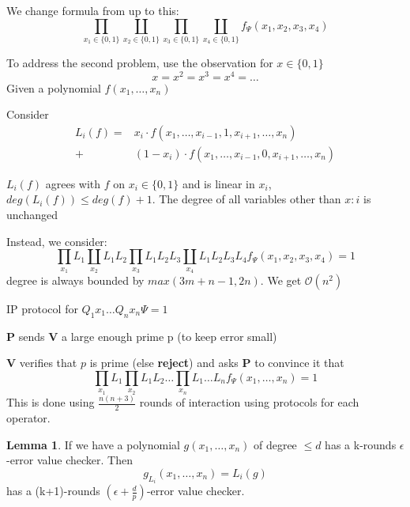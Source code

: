\documentclass[a4paper,12pt]{article}
\theoremstyle{definition}
\newtheorem{lemma}[counter]{Lemma}
\theoremstyle{remark}
\begin{document}
We change formula from up to this:
\begin{equation*}
    \prod_{x_1 \in \{0, 1\}} \coprod_{x_2 \in \{0, 1\}} \prod_{x_3 \in \{0, 1\}} \coprod_{x_4 \in \{0, 1\}} f_\Psi (x_1, x_2, x_3, x_4)
\end{equation*}

To address the second problem, use the observation for $x \in \{0, 1\}$
\begin{equation*}
    x = x^2 = x^3 = x^4 = \dots
\end{equation*}
Given a polynomial $f(x_1, \dots, x_n)$

Consider
\begin{align*}
    L_i(f) =& x_i \cdot f(x_1, \dots, x_{i-1}, 1, x_{i+1}, \dots, x_n) \\
           +& (1 - x_i) \cdot f(x_1, \dots, x_{i-1}, 0, x_{i+1}, \dots, x_n)
\end{align*}

$L_i(f)$ agrees with $f$ on $x_i \in \{0, 1\}$ and is linear in $x_i$, $deg(L_i(f)) \leq deg(f) + 1$.
The degree of all variables other than $x:i$ is unchanged

Instead, we consider:
\begin{equation*}
    \prod_{x_1} L_1 \coprod_{x_2} L_1 L_2 \prod_{x_3} L_1 L_2 L_3 \coprod_{x_4} L_1 L_2 L_3 L_4 f_\Psi(x_1, x_2, x_3, x_4) = 1
\end{equation*}
degree is always bounded by $max(3m + n - 1, 2n)$. We get $\mathscr{O}(n^2)$

IP protocol for $Q_1 x_1 \dots Q_n x_n \Psi = 1$

\textbf{P} sends \textbf{V} a large enough prime p (to keep error small)

\textbf{V} verifies that $p$ is prime (else \textbf{reject}) and
asks \textbf{P} to convince it that
\begin{equation*}
    \prod_{x_1} L_1 \prod_{x_2} L_1 L_2 \dots \prod_{x_n} L_1 \dots L_n f_\Psi (x_1, \dots, x_n) = 1 %
\end{equation*}
This is done using $\frac{n (n + 3)}{2}$ rounds of interaction using protocols for each operator.

\begin{lemma}
    If we have a polynomial $g(x_1, \dots, x_n)$ of degree $\leq d$ has a k-rounds $\epsilon$-error value checker.
    Then 
    \begin{equation*}
        g_{L_i} (x_1, \dots, x_n) = L_i(g)
    \end{equation*}
    has a (k+1)-rounds $(\epsilon + \frac{d}{p})$-error value checker.
\end{lemma}
\end{document}
